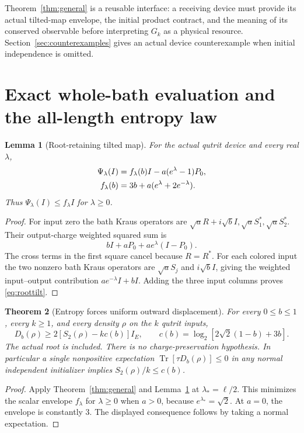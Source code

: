 \documentclass[11pt]{article}
\newtheorem{theorem}{Theorem}[section]
\newtheorem{lemma}[theorem]{Lemma}
\newcommand{\Tr}{\operatorname{Tr}}
\begin{document}
Theorem~\ref{thm:general} is a reusable interface: a receiving device must
provide its actual tilted-map envelope, the initial product contract,
and the meaning of its conserved observable before interpreting \(G_k\)
as a physical resource. Section~\ref{sec:counterexamples} gives an actual
device counterexample when initial independence is omitted.

\section{Exact whole-bath evaluation and the all-length entropy law}

\begin{lemma}[Root-retaining tilted map]\label{lem:tilt}
For the actual qutrit device and every real \(\lambda\),
\begin{align}
 \Psi_\lambda(I)
 &=f_\lambda(b)I-a(e^\lambda-1)P_0,\label{eq:roottilt}\\
 f_\lambda(b)&=3b+a(e^\lambda+2e^{-\lambda}).\notag
\end{align}
Thus \(\Psi_\lambda(I)\le f_\lambda I\) for \(\lambda\ge0\).
\end{lemma}
\begin{proof}
For input zero the bath Kraus operators are
\(\sqrt a R+i\sqrt b I,\sqrt a S_1^*,\sqrt a S_2^*\).
Their output-charge weighted squared sum is
\[
 bI+aP_0+ae^\lambda(I-P_0).
\]
The cross terms in the first square cancel because \(R=R^*\).
For each colored input the two nonzero bath Kraus operators are
\(\sqrt a S_j\) and \(i\sqrt b I\), giving the weighted input--output
contribution \(ae^{-\lambda}I+bI\).
Adding the three input columns proves \eqref{eq:roottilt}.
\end{proof}

\begin{theorem}[Entropy forces uniform outward displacement]
\label{thm:entropyoperator}
For every \(0\le b\le1\), every \(k\ge1\), and every density \(\rho\)
on the \(k\) qutrit inputs,
\begin{equation}\label{eq:mainoperator}
 \boxed{D_b(\rho)\ge2[S_2(\rho)-k c(b)]I_E,\qquad
 c(b)=\log_2[2\sqrt2(1-b)+3b].}
\end{equation}
The actual root is included. There is no charge-preservation hypothesis.
In particular a single nonpositive expectation
\(\Tr[\tau D_b(\rho)]\le0\) in any normal independent initializer implies
\(S_2(\rho)/k\le c(b)\).
\end{theorem}
\begin{proof}
Apply Theorem~\ref{thm:general} and Lemma~\ref{lem:tilt} at
\(\lambda_*=\ell/2\). This minimizes the scalar envelope
\(f_\lambda\) for \(\lambda\ge0\) when \(a>0\), because
\(e^{\lambda_*}=\sqrt2\). At \(a=0\), the envelope is constantly \(3\).
The displayed consequence follows by taking a normal expectation.
\end{proof}
\end{document}
